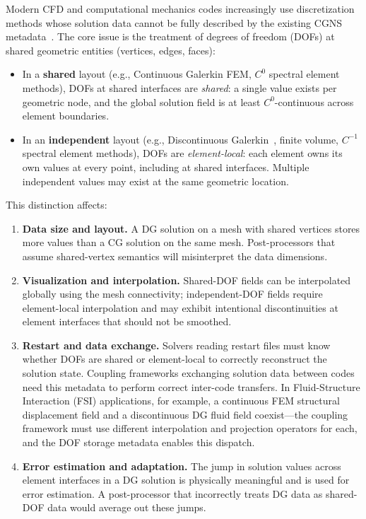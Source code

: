 \documentclass[11pt,letterpaper]{article}
\begin{document}
Modern CFD and computational mechanics codes increasingly use
discretization methods whose solution data cannot be fully described
by the existing CGNS metadata~\cite{cgns-sids}.  The core issue is the
treatment of degrees of freedom (DOFs) at shared geometric entities
(vertices, edges, faces):

\begin{itemize}[leftmargin=2em]
\item In a \textbf{shared} layout (e.g., Continuous
  Galerkin FEM, $C^0$ spectral element methods), DOFs at shared
  interfaces are \emph{shared}: a single value exists per geometric
  node, and the global solution field is at least $C^0$-continuous
  across element boundaries.

\item In an \textbf{independent} layout (e.g., Discontinuous
  Galerkin~\cite{hesthaven2008,cockburn2000}, finite volume,
  $C^{-1}$ spectral element methods), DOFs
  are \emph{element-local}: each element owns its own values at every
  point, including at shared interfaces.  Multiple independent values
  may exist at the same geometric location.
\end{itemize}

This distinction affects:

\begin{enumerate}[leftmargin=2em]
\item \textbf{Data size and layout.}  A DG solution on a mesh with
  shared vertices stores more values than a CG solution on the same
  mesh.  Post-processors that assume shared-vertex semantics will
  misinterpret the data dimensions.

\item \textbf{Visualization and interpolation.}  Shared-DOF fields can be
  interpolated globally using the mesh connectivity; independent-DOF fields
  require element-local interpolation and may exhibit intentional
  discontinuities at element interfaces that should not be smoothed.

\item \textbf{Restart and data exchange.}  Solvers reading restart
  files must know whether DOFs are shared or element-local to
  correctly reconstruct the solution state.  Coupling frameworks
  exchanging solution data between codes need this metadata to perform
  correct inter-code transfers.  In Fluid-Structure Interaction (FSI)
  applications, for example, a continuous FEM structural displacement
  field and a discontinuous DG fluid field coexist---the coupling
  framework must use different interpolation and projection operators
  for each, and the DOF storage metadata enables this dispatch.

\item \textbf{Error estimation and adaptation.}  The jump in solution
  values across element interfaces in a DG solution is physically
  meaningful and is used for error estimation.  A post-processor that
  incorrectly treats DG data as shared-DOF data would average out these
  jumps.
\end{enumerate}
\end{document}
